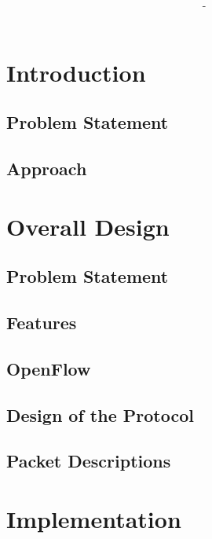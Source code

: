 \documentclass{article}
\title{\textbf{\moduleCode\ \moduleName}}
\author{\authorName\ -\ \authorID}
\begin{document}
\captionsetup{width=.8\linewidth} 

\maketitle
\tableofcontents

\newpage

\section{Introduction}

\subsection{Problem Statement}

\subsection{Approach}

\section{Overall Design}

\subsection{Problem Statement}

\subsection{Features}

\subsection{OpenFlow}

\subsection{Design of the Protocol}

\subsection{Packet Descriptions}

\section{Implementation}
\end{document}
